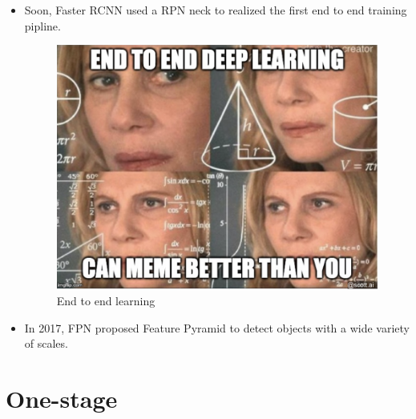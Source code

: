 \documentclass{beamer}
\begin{document}
\begin{frame}
    \begin{itemize}
        \item Soon, Faster RCNN\cite{faster} used a RPN neck to realized the first end to end training pipline. 
        \begin{figure}[h!]
            \begin{center}
                \includegraphics[width=0.5\linewidth]{memeendtoend.png}
                \caption{\small End to end learning}
            \end{center}
        \end{figure}
        
        \item In 2017, FPN\cite{fpn} proposed Feature Pyramid to detect objects with a wide variety of scales. 
    \end{itemize}
\end{frame}


\section{One-stage}


\end{document}
